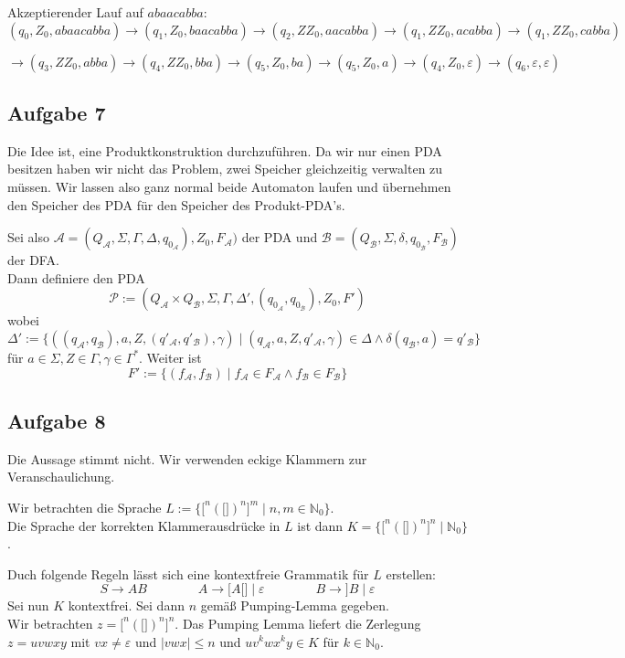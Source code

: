 \documentclass[a4paper,graphics,11pt]{article}
\newcommand{\aufgabe}[1]{\subsection*{Aufgabe #1}}
\begin{document}
Akzeptierender Lauf auf $abaacabba$:\\
$(q_0,Z_0,abaacabba)\rightarrow(q_1,Z_0,baacabba)\rightarrow(q_2,ZZ_0,aacabba)\rightarrow(q_1,ZZ_0,acabba)\rightarrow(q_1,ZZ_0,cabba)$

$\rightarrow(q_3,ZZ_0,abba)\rightarrow(q_4,ZZ_0,bba)\rightarrow(q_5,Z_0,ba)\rightarrow(q_5,Z_0,a)\rightarrow(q_4,Z_0,\varepsilon)\rightarrow(q_6,\varepsilon,\varepsilon)$



\newpage

\aufgabe{7}
Die Idee ist, eine Produktkonstruktion durchzuführen. Da wir nur einen PDA besitzen haben wir nicht das Problem,
zwei Speicher gleichzeitig verwalten zu müssen. Wir lassen also ganz normal beide Automaton laufen
und übernehmen den Speicher des PDA für den Speicher des Produkt-PDA's.

Sei also $\mathcal{A} = (Q_\mathcal{A}, \Sigma, \Gamma, \Delta, q_{0_\mathcal{A}}), Z_0, F_\mathcal{A})$
der PDA
und $\mathcal{B} = (Q_\mathcal{B}, \Sigma, \delta, q_{0_\mathcal{B}}, F_\mathcal{B})$ der DFA.\\
Dann definiere den PDA
$$
    \mathcal{P} := (Q_\mathcal{A} \times Q_\mathcal{B}, \Sigma, \Gamma, \Delta', (q_{0_\mathcal{A}}, q_{0_\mathcal{B}}), Z_0, F')
$$
wobei
$$
    \Delta' := \{((q_\mathcal{A}, q_\mathcal{B}), a, Z, (q'_\mathcal{A}, q'_\mathcal{B}), \gamma)
    \mid (q_\mathcal{A}, a, Z, q'_\mathcal{A}, \gamma) \in \Delta \land \delta(q_\mathcal{B}, a) = q'_\mathcal{B}\}
$$
für $a \in \Sigma, Z \in \Gamma, \gamma \in \Gamma^*$.
Weiter ist
$$
    F' := \{(f_\mathcal{A},f_\mathcal{B}) \mid f_\mathcal{A} \in F_\mathcal{A} \land f_\mathcal{B} \in F_\mathcal{B}\}
$$

\aufgabe{8}

Die Aussage stimmt nicht. Wir verwenden eckige Klammern zur Veranschaulichung.

Wir betrachten die Sprache $L := \{\texttt{[}^n(\texttt{[]})^n\texttt{]}^m \mid n,m \in \mathbb{N}_0\}$.\\
Die Sprache der korrekten Klammerausdrücke in $L$ ist dann
$K = \{\texttt{[}^n(\texttt{[]})^n\texttt{]}^n \mid \mathbb{N}_0\}$.

Duch folgende Regeln lässt sich eine kontextfreie Grammatik für $L$ erstellen:
$$
    S \to AB
    \qquad\qquad
    A \to \texttt{[}A\texttt{[]} \mid \varepsilon
    \qquad\qquad
    B \to \texttt{]}B \mid \varepsilon
$$
Sei nun $K$ kontextfrei. Sei dann $n$ gemäß Pumping-Lemma gegeben.\\
Wir betrachten $z = \texttt{[}^n(\texttt{[]})^n\texttt{]}^n$. Das Pumping Lemma liefert die Zerlegung $z = uvwxy$
mit $vx \neq \varepsilon$ und $|vwx| \leq n$ und $uv^kwx^ky \in K$ für $k \in \mathbb{N}_0$.
\end{document}
